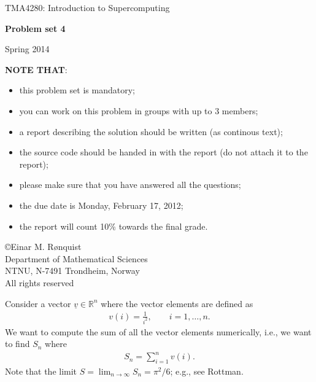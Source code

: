 \documentclass[11pt]{article}
\begin{document}
 
\LARGE
\begin{center}
TMA4280: Introduction to Supercomputing
\end{center}
\vspace{1in}

\begin{center}
{\bf Problem set 4}
\end{center}

\Large
\vspace{0.5in}
\begin{center}
Spring 2014
\end{center}

\vspace{0.5in}

{\bf NOTE THAT}:
\begin{itemize}
  \item this problem set is mandatory;
  \item you can work on this problem in groups with up to 3 members;
  \item a report describing the solution should be written (as continous text);
  \item the source code should be handed in with the report (do not attach it to the report);
  \item please make sure that you have answered all the questions; 
  \item the due date is Monday, February 17, 2012;
  \item the report will count 10\% towards the final grade.
\end{itemize}

\vspace{0.5in}

\begin{center}
\copyright Einar M. R{\o}nquist \\
Department of Mathematical Sciences\\
NTNU, N-7491 Trondheim, Norway\\
All rights reserved
\end{center}

\large

\newpage

\noindent 
Consider a vector $\underline{v} \in \mathbb{R}^n$ where the vector elements are defined as
\begin{align}
  v(i) = \frac{1}{i^2}, \qquad i=1,\ldots, n. 
\end{align}
We want to compute the sum of all the vector elements numerically, i.e., 
we want to find $S_n$ where
\begin{align}
  S_n = \sum_{i=1}^n v(i).
\end{align}
Note that the limit $S = \lim_{n\rightarrow\infty} S_n = \pi^2/6$; e.g., see Rottman.
\vspace{1cm}
\end{document}
